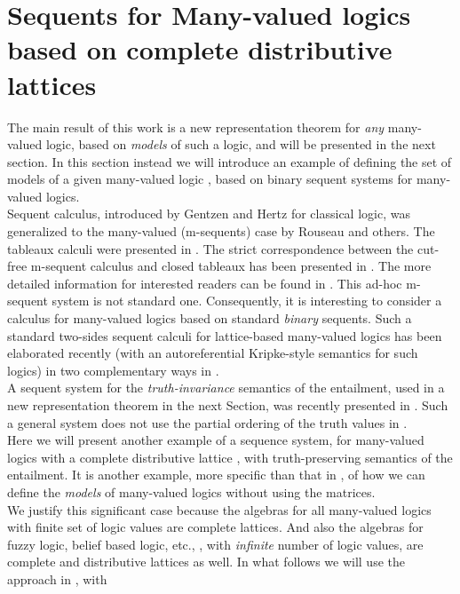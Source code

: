 \documentclass[10pt,twocolumn]{article}
\begin{document}
\section{Sequents for Many-valued logics based on complete distributive lattices}
The main result of this work is a new representation theorem for
\emph{any} many-valued logic, based on \emph{models} of such a
logic, and will be presented in the next section. In this section
instead we will introduce an example of defining the set of models
of a given many-valued logic , based on binary sequent systems
for many-valued logics. \\
Sequent calculus, introduced by Gentzen \cite{Gent32} and Hertz
\cite{Hert29} for classical logic, was generalized to the
many-valued (m-sequents) case by Rouseau \cite{Rous67} and others.
The tableaux calculi were presented in \cite{Carni87,Hanh91}. The
strict correspondence between the cut-free m-sequent calculus and
closed tableaux has been presented in \cite{BFZa93a}. The more
detailed information for interested readers can be found in
\cite{BFZa93,BFSa00}. This ad-hoc m-sequent system is not standard
one. Consequently, it is interesting to consider a calculus for
many-valued logics based on standard \emph{binary} sequents.
Such a standard two-sides sequent
  calculi for  lattice-based many-valued logics
has been  elaborated  recently (with an autoreferential Kripke-style semantics for such
  logics) in two complementary ways in
  \cite{Majk06ml,Majk08dC}.\\
A sequent system for the \emph{truth-invariance} semantics of the
entailment, used in a new representation theorem in the next
Section, was recently presented in \cite{Majk09BS}. Such a general system does not use the partial ordering of the truth values in . \\
 Here we will present another example of a sequence system, for many-valued logics with a
complete distributive lattice , with truth-preserving semantics
of the entailment. It is another example, more specific than that in
\cite{Majk09BS},  of how we can define
the \emph{models} of many-valued logics without using the matrices.\\
We justify this significant case because the algebras for all
many-valued logics with finite set of logic values are complete
lattices. And also the algebras for fuzzy logic, belief based logic,
etc., \cite{Majk06Bi}, with \emph{infinite} number of logic values,
are complete and distributive lattices as well.
In what follows we will use the approach in \cite{Majk08dC}, with
\end{document}
